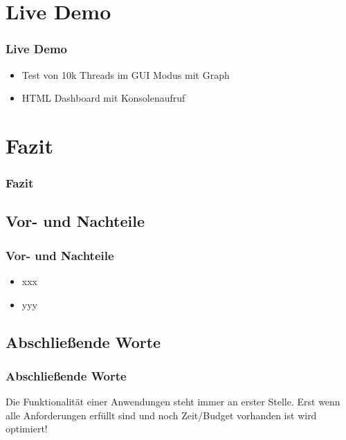 \documentclass[xcolor=dvipsnames]{beamer}
\newcommand{\pro}{\item[\boldmath${\color{green}+}$ ]}
\newcommand{\con}{\item[\boldmath$ {\color{red}-}$ ]}
\begin{document}
\section{Live Demo}
\begin{frame}
\frametitle{Live Demo}
\begin{itemize}
	\item Test von 10k Threads im GUI Modus mit Graph 
	\item HTML Dashboard mit Konsolenaufruf
\end{itemize}
\end{frame}

 
\section{Fazit}
\begin{frame}
\frametitle{Fazit}
\end{frame}

\subsection{Vor- und Nachteile}	
\begin{frame}
	\frametitle{Vor- und Nachteile}
	\begin{itemize}
	  \pro xxx
		\con yyy
	\end{itemize}
\end{frame}

\subsection{Abschließende Worte}
\begin{frame}
\frametitle{Abschließende Worte}


	Die Funktionalität einer Anwendungen steht immer an erster Stelle. Erst wenn alle Anforderungen erfüllt sind und noch Zeit/Budget vorhanden ist wird optimiert! 
	\end{frame}
\end{document}
